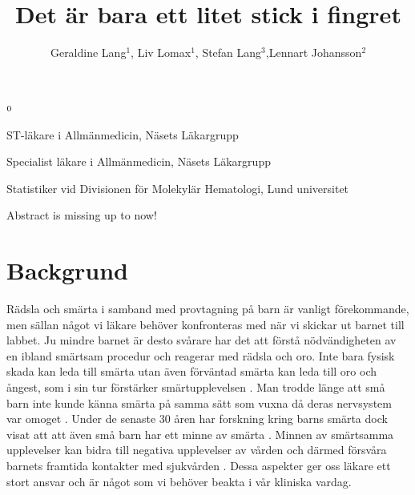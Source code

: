 \documentclass[12pt,twocolumn]{article}
\title{Det \"ar bara ett litet stick i fingret}
\author{Geraldine Lang$^{1}$, Liv Lomax$^1$, Stefan Lang$^3$,Lennart
Johansson$^2$}
\newenvironment{affiliations}{%
    \setcounter{enumi}{1}%
    \setlength{\parindent}{0in}%
    \slshape\sloppy%
    \begin{list}{\upshape$^{\arabic{enumi}}$}{%
        \usecounter{enumi}%
        \setlength{\leftmargin}{0in}%
        \setlength{\topsep}{0in}%
        \setlength{\labelsep}{0in}%
        \setlength{\labelwidth}{0in}%
        \setlength{\listparindent}{0in}%
        \setlength{\itemsep}{0ex}%
        \setlength{\parsep}{0in}%
        }
    }{\end{list}\par\vspace{12pt}}
\renewenvironment{abstract}{%
    \setlength{\parindent}{0in}%
    \setlength{\parskip}{0in}%
    \bfseries%
    }{\par\vspace{-6pt}}
\begin{document}
\onecolumn

\maketitle

\begin{affiliations}
 \item ST-l\"akare i Allm\"anmedicin, N\"asets L\"akargrupp
 \item Specialist l\"akare i Allm\"anmedicin, N\"asets L\"akargrupp
 \item Statistiker vid Divisionen f\"or Molekyl\"ar Hematologi, Lund universitet
\end{affiliations}

\begin{abstract}
Abstract is missing up to now!
\end{abstract}


\twocolumn

\newpage

\section{Backgrund}

R\"adsla och sm\"arta i samband med provtagning p\r{a} barn \"ar vanligt
f\"orekommande, men s\"allan n\r{a}got vi l\"akare beh\"over konfronteras med
n\"ar vi skickar ut barnet till labbet. Ju mindre barnet \"ar desto sv\r{a}rare
har det att f\"orst\r{a} n\"odv\"andigheten av en ibland sm\"artsam procedur och
reagerar med r\"adsla och oro. Inte bara fysisk skada kan leda till sm\"arta
utan \"aven f\"orv\"antad sm\"arta kan leda till oro och \r{a}ngest, som i sin
tur f\"orst\"arker sm\"artupplevelsen \cite{Carverius2014}.
Man trodde l\"ange att sm\r{a} barn inte kunde k\"anna sm\"arta p\r{a} samma
s\"att som vuxna d\r{a} deras nervsystem var omoget \cite{Rey1993}. Under de
senaste 30
\r{a}ren har forskning kring barns sm\"arta dock visat att att \"aven sm\r{a}
barn har ett minne av sm\"arta \cite{Anand2007,Fitzgerald2001,Schechter2003}.
Minnen av sm\"artsamma upplevelser kan bidra till negativa upplevelser av
v\r{a}rden och d\"armed f\"orsv\r{a}ra barnets framtida kontakter med
sjukv\r{a}rden \cite{vBayer2004}. Dessa aspekter ger oss l\"akare ett stort
ansvar och \"ar n\r{a}got som vi beh\"over beakta i v\r{a}r kliniska vardag.
\end{document}
